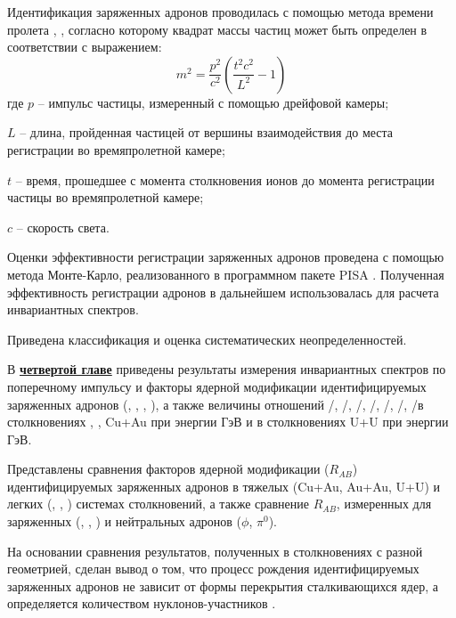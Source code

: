 Идентификация заряженных адронов проводилась с помощью метода времени пролета \autocite{nucleus2020}, \cite{PPG026, ppg146}, согласно которому квадрат массы частиц может быть определен в соответствии с выражением: 
$$m^2 = \frac{p^2}{c^2} \left(  \frac{t^2 c^2}{L^2} - 1\right)$$
где $p$ -- импульс частицы, измеренный с помощью дрейфовой камеры; 

$L$ -- длина, пройденная частицей от вершины взаимодействия до места регистрации во времяпролетной камере; 

$t$ -- время, прошедшее с момента столкновения ионов до момента регистрации частицы во времяпролетной камере; 

$c$ -- скорость света.

Оценки эффективности регистрации заряженных адронов проведена с помощью метода Монте-Карло, реализованного в программном пакете PISA \cite{PISA}. Полученная эффективность регистрации адронов в дальнейшем использовалась для расчета инвариантных спектров. 

Приведена классификация и оценка систематических неопределенностей. %

\begin{comment}
Формулы в строку без номера добавляются так:
\[
    \lambda_{T_s} = K_x\frac{d{x}}{d{T_s}}, \qquad
    \lambda_{q_s} = K_x\frac{d{x}}{d{q_s}},
\]
\end{comment}

В \underline{\textbf{четвертой главе}} приведены результаты измерения инвариантных спектров по поперечному импульсу и факторы ядерной модификации идентифицируемых заряженных адронов (\pipm, \Kpm, \prot, \aprot), а также величины отношений \pim/\pip, \Km/\Kp, \prot/\aprot, \prot/\pip, \aprot/\pim, \Kp/\pip, \Km/\pim в столкновениях  \pal, \heau, Cu+Au при энергии  ГэВ и в столкновениях U+U при энергии  ГэВ. 

Представлены сравнения факторов ядерной модификации ($R_{AB}$) идентифицируемых заряженных адронов в тяжелых (Cu+Au, Au+Au, U+U) и легких (\pal, \dau, \heau) системах столкновений, а также сравнение $R_{AB}$, измеренных для заряженных (\pipm, \Kpm, \prots) и нейтральных адронов ($\phi$, $\pi^{0}$).

На основании сравнения результатов, полученных в столкновениях с разной геометрией, сделан вывод о том, что процесс рождения идентифицируемых заряженных адронов не зависит от формы перекрытия сталкивающихся ядер, а определяется количеством нуклонов-участников \Npart.

